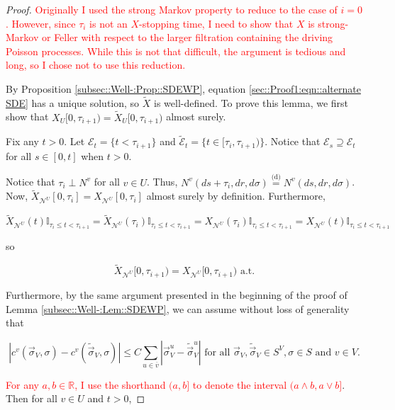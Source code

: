 \documentclass[12pt]{article}
\newcommand{\mb}{\mathbb}
\newcommand{\mc}{\mathcal}
\newcommand{\ov}{\overline}
\newcommand{\te}{\text}
\newcommand{\tr}{\textcolor{red}}
\newcommand{\ind}{\hspace{24pt}}
\newcommand{\deq}{\overset{\text{(d)}}{=}}			%
\renewcommand{\v}{v}							%
\newcommand{\vv}{u}								%
\renewcommand{\U}{U}							%
\renewcommand{\S}{S}							%
\newcommand{\s}{\sigma}							%
\newcommand{\sv}{\vec{\s}}						%
\renewcommand{\t}{t}							%
\renewcommand{\tt}{s}							%
\newcommand{\X}{X}								%
\newcommand{\IGr}{c}							%
\newcommand{\neigh}{\mc{N}}						%
\newcommand{\vind}[1]{^{#1}}					%
\newcommand{\carp}[1]{^{#1}}					%
\newcommand{\vsi}[1]{^{#1}}						%
\newcommand{\cind}[1]{_{#1}}					%
\newcommand{\cl}{\ov}							%
\newcommand{\tp}[1]{(#1)}						%
\newcommand{\tip}[1]{#1}						%
\newcommand{\ts}[1]{_{#1}}						%
\newcommand{\const}{C}							%
\newcommand{\poiss}{N}							%
\newcommand{\alt}[1]{\widetilde{#1}}			%
\newcommand{\indx}[1]{_{#1}}					%
\newcommand{\rt}{\tau}							%
\newcommand{\evnt}{\mc{E}}						%
\begin{document}
\begin{proof}
\ind \tr{Originally I used the strong Markov property to reduce to the case of \(i = 0\). However, since \(\rt\indx{i}\) is not an \(\X\)-stopping time, I need to show that \(\X\) is strong-Markov or Feller with respect to the larger filtration containing the driving Poisson processes. While this is not that difficult, the argument is tedious and long, so I chose not to use this reduction.}

\ind By Proposition \ref{subsec::Well-:Prop::SDEWP}, equation \eqref{sec::Proof1:eqn::alternate SDE} has a unique solution, so \(\alt{\X}\) is well-defined. To prove this lemma, we first show that \(\X\cind{\U}\tip{[0,\rt\indx{i+1})} = \alt{\X}\cind{\U}{[0,\rt\indx{i+1})}\) almost surely. 

\ind Fix any \(\t > 0\). Let \(\evnt\ts{\t} = \{\t < \rt\indx{i+1}\}\) and \(\alt{\evnt}\ts{\t} = \{\t\in [\rt\indx{i},\rt\indx{i+1})\}\). Notice that \(\evnt\ts{\tt} \supseteq \evnt\ts{\t}\) for all \(\tt\in [0,\t]\) when \(\t > 0\). 

\ind Notice that \(\rt\indx{i} \perp \poiss\vind{\v}\) for all \(\v \in \U\). Thus, \(\poiss\vind{\v}(d\tt+\rt\indx{i},dr,d\s) \deq \poiss\vind{\v}(d\tt,dr,d\s)\). Now, \(\alt{\X}\cind{\neigh\vind{\U}}\tip{[0,\rt\indx{i}]} = \X\cind{\neigh\vind{\U}}\tip{[0,\rt\indx{i}]}\) almost surely by definition. Furthermore,

\[\alt{\X}\cind{\neigh\vind{\U}}\tp{\t}\mb{I}_{\rt\indx{i}\leq \t < \rt\indx{i+1}} = \alt{\X}\cind{\neigh\vind{\U}}\tp{\rt\indx{i}}\mb{I}_{\rt\indx{i}\leq \t < \rt\indx{i+1}} = \X\cind{\neigh\vind{\U}}\tp{\rt\indx{i}}\mb{I}_{\rt\indx{i}\leq \t < \rt\indx{i+1}} = \X\cind{\neigh\vind{\U}}\tp{\t}\mb{I}_{\rt\indx{i}\leq \t < \rt\indx{i+1}}\]

so

\[\alt{\X}\cind{\neigh\vind{\U}}\tip{[0,\rt\indx{i+1})} = \X\cind{\neigh\vind{\U}}\tip{[0,\rt\indx{i+1})} \te{ a.t.}\]

Furthermore, by the same argument presented in the beginning of the proof of Lemma \ref{subsec::Well-:Lem::SDEWP}, we can assume without loss of generality that 

\[|\IGr\vind{\v}(\sv\cind{V},\s) - \IGr\vind{\v}(\alt{\sv}\cind{V},\s)| \leq \const\sum_{\vv\in \cl{\v}} |\sv\cind{V}\vsi{\vv} - \alt{\sv}\cind{V}\vsi{\vv}|\te{ for all } \sv\cind{V},\alt{\sv}\cind{V}\in \S\carp{V},\s \in \S \te{ and } \v \in V.\]

\tr{For any \(a,b\in \mb{R}\), I use the shorthand \((a,b]\) to denote the interval \((a\wedge b,a\vee b]\)}. Then for all \(v\in \U\) and \(\t > 0\),


\end{proof}
\end{document}
